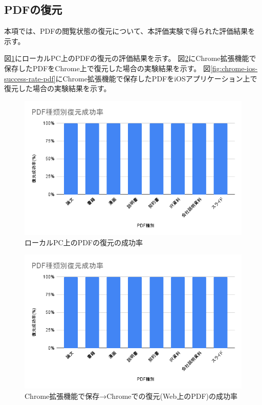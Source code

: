 \subsection{PDFの復元}
本項では、PDFの閲覧状態の復元について、本評価実験で得られた評価結果を示す。




図\ref{fig:local-success-rate-pdf}にローカルPC上のPDFの復元の評価結果を示す。
図\ref{fig:chrome-chrome-success-rate-pdf}にChrome拡張機能で保存したPDFをChrome上で復元した場合の実験結果を示す。
図\ref{fig:chrome-ios-success-rate-pdf}にChrome拡張機能で保存したPDFをiOSアプリケーション上で復元した場合の実験結果を示す。

\begin{figure}[htbp]
  \caption{ローカルPC上のPDFの復元の成功率}
  \label{fig:local-success-rate-pdf}
  \begin{center}
    \includegraphics[bb=0 0 600 371,width=15cm]{img/060_evaluation/success-rate-pdf.pdf}
  \end{center}
\end{figure}

\begin{figure}[htbp]
  \caption{Chrome拡張機能で保存→Chromeでの復元(Web上のPDF)の成功率}
  \label{fig:chrome-chrome-success-rate-pdf}
  \begin{center}
    \includegraphics[bb=0 0 600 371,width=15cm]{img/060_evaluation/success-rate-pdf.pdf}
  \end{center}
\end{figure}

